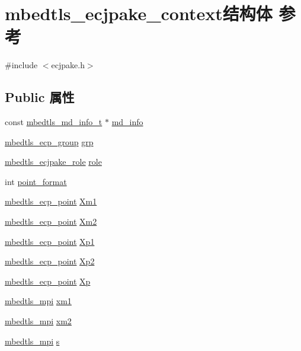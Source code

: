 \hypertarget{structmbedtls__ecjpake__context}{}\section{mbedtls\+\_\+ecjpake\+\_\+context结构体 参考}
\label{structmbedtls__ecjpake__context}


{\ttfamily \#include $<$ecjpake.\+h$>$}

\subsection*{Public 属性}
\begin{DoxyCompactItemize}
\item 
const \hyperlink{structmbedtls__md__info__t}{mbedtls\+\_\+md\+\_\+info\+\_\+t} $\ast$ \hyperlink{structmbedtls__ecjpake__context_a2c8920999ae02d5742f4dcfd0a36e02c}{md\+\_\+info}
\item 
\hyperlink{structmbedtls__ecp__group}{mbedtls\+\_\+ecp\+\_\+group} \hyperlink{structmbedtls__ecjpake__context_ac2604256267f50b4bd75f17655c6299a}{grp}
\item 
\hyperlink{ecjpake_8h_a3f1fa77b9cda6a2540b9bd6b84fb9f3f}{mbedtls\+\_\+ecjpake\+\_\+role} \hyperlink{structmbedtls__ecjpake__context_a50dc89b5a0871cdee0e1e78d5848b364}{role}
\item 
int \hyperlink{structmbedtls__ecjpake__context_acf904eb3228525b6b74117b2c9686fd3}{point\+\_\+format}
\item 
\hyperlink{structmbedtls__ecp__point}{mbedtls\+\_\+ecp\+\_\+point} \hyperlink{structmbedtls__ecjpake__context_af48836057581977acd52e7bf079a3368}{Xm1}
\item 
\hyperlink{structmbedtls__ecp__point}{mbedtls\+\_\+ecp\+\_\+point} \hyperlink{structmbedtls__ecjpake__context_a55676584cea41d167008b594748ca0d5}{Xm2}
\item 
\hyperlink{structmbedtls__ecp__point}{mbedtls\+\_\+ecp\+\_\+point} \hyperlink{structmbedtls__ecjpake__context_a3278c6093f4ef2bfd90984fc3d4cf773}{Xp1}
\item 
\hyperlink{structmbedtls__ecp__point}{mbedtls\+\_\+ecp\+\_\+point} \hyperlink{structmbedtls__ecjpake__context_a586f1c91152f57b4398b5e9711b93c46}{Xp2}
\item 
\hyperlink{structmbedtls__ecp__point}{mbedtls\+\_\+ecp\+\_\+point} \hyperlink{structmbedtls__ecjpake__context_a8f830784980935408a08b5a7e37f7a88}{Xp}
\item 
\hyperlink{structmbedtls__mpi}{mbedtls\+\_\+mpi} \hyperlink{structmbedtls__ecjpake__context_adb90dac8428128ad65d595fc9904fdd3}{xm1}
\item 
\hyperlink{structmbedtls__mpi}{mbedtls\+\_\+mpi} \hyperlink{structmbedtls__ecjpake__context_ae1769cd75e437d673b4a49fc0d01bafc}{xm2}
\item 
\hyperlink{structmbedtls__mpi}{mbedtls\+\_\+mpi} \hyperlink{structmbedtls__ecjpake__context_a532bce70f1a6652df129e28e7193357a}{s}
\end{DoxyCompactItemize}


